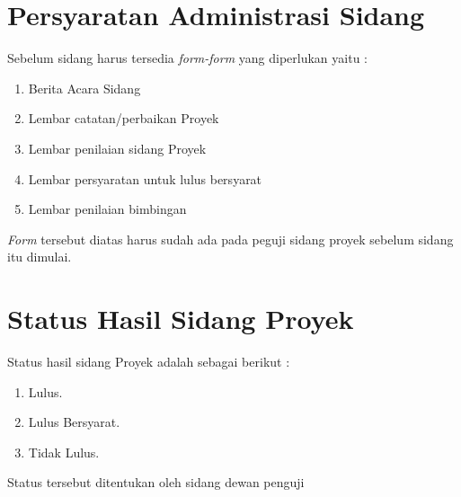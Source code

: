 \section{Persyaratan	Administrasi	Sidang}
	Sebelum	sidang harus	tersedia \textit{form-form} yang	diperlukan	yaitu	:
	\begin{enumerate}
		\item Berita	Acara	Sidang
		\item Lembar	catatan/perbaikan	Proyek	
		\item Lembar	penilaian	sidang Proyek
		\item Lembar	persyaratan	untuk	lulus	bersyarat	
		\item Lembar	penilaian	bimbingan	
	\end{enumerate}
	\par \textit{Form} tersebut	 diatas	 harus	 sudah	 ada	 pada	 peguji	 sidang	 proyek	 sebelum	 sidang	 itu	
dimulai.

\section{Status	Hasil	Sidang Proyek}
Status	hasil	sidang Proyek	adalah	sebagai	berikut	:
\begin{enumerate}
\item Lulus.
\item Lulus Bersyarat.
\item Tidak Lulus.
\end{enumerate}
\par Status	tersebut	ditentukan	oleh	sidang	dewan	penguji